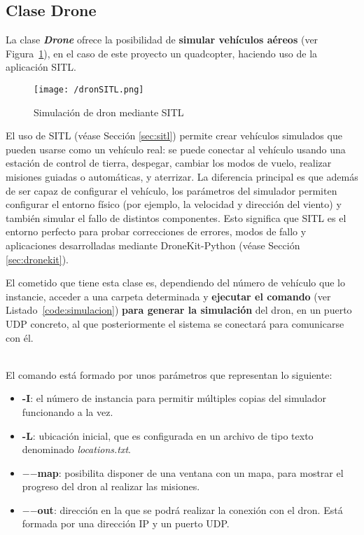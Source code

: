 \subsection{Clase Drone}

La clase \textbf{\textit{Drone}} ofrece la posibilidad de \textbf{simular vehículos aéreos} (ver Figura~\ref{fig:dronSITL}), en el caso de este proyecto un quadcopter, haciendo uso de la aplicación \acs{SITL}.

\begin{figure}[!h]
\begin{center}
\texttt{[image: /dronSITL.png]}
\caption[Simulación de dron mediante \acs{SITL}]{Simulación de dron mediante \acs{SITL}}
\label{fig:dronSITL}
\end{center}
\end{figure}

El uso de \acs{SITL} (véase Sección \ref{sec:sitl}) permite crear vehículos simulados que pueden usarse como un vehículo real: se puede conectar al vehículo usando una estación de control de tierra, despegar, cambiar los modos de vuelo, realizar misiones guiadas o automáticas, y aterrizar. La diferencia principal es que además de ser capaz de configurar el vehículo, los parámetros del simulador permiten configurar el entorno físico (por ejemplo, la velocidad y dirección del viento) y también simular el fallo de distintos componentes. Esto significa que \acs{SITL} es el entorno perfecto para probar correcciones de errores, modos de fallo y aplicaciones desarrolladas mediante DroneKit-Python (véase Sección \ref{sec:dronekit}).

El cometido que tiene esta clase es, dependiendo del número de vehículo que lo instancie, acceder a una carpeta determinada y \textbf{ejecutar el comando} (ver Listado~\ref{code:simulacion}) \textbf{para generar la simulación} del dron, en un puerto UDP concreto, al que posteriormente el sistema se conectará para comunicarse con él. \\ \\


El comando está formado por unos parámetros que representan lo siguiente:
\begin{itemize}
\item \textbf{-I}: el número de instancia para permitir múltiples copias del simulador funcionando a la vez.
\item \textbf{-L}: ubicación inicial, que es configurada en un archivo de tipo texto denominado \textit{locations.txt}.
\item \textbf{$-$$-$map}: posibilita disponer de una ventana con un mapa, para mostrar el progreso del dron al realizar las misiones.
\item \textbf{$-$$-$out}: dirección en la que se podrá realizar la conexión con el dron. Está formada por una dirección IP y un puerto UDP.
\end{itemize}

